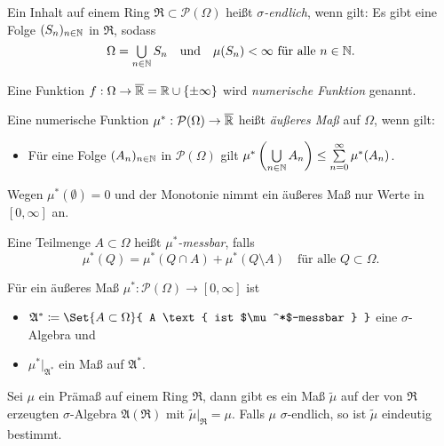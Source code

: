 \documentclass{cheat-sheet}
\newcommand{\PS}{\mathcal{P}} %
\newcommand{\PSO}{\PS(\Omega)} %
\newcommand{\Alg}{\mathfrak{A}} %
\newcommand{\Ring}{\mathfrak{R}} %
\theoremstyle{definition}
\begin{document}
\begin{defn}
  Ein Inhalt auf einem Ring $\Ring \subset \PSO$ heißt \emph{$\sigma$-endlich}, wenn gilt: Es gibt eine Folge $(S_n)_{n \in \mathbb{N}}$ in $\Ring$, sodass
  \[
      \Omega = \bigcup_{n \in \N} S_n
      \quad \text{und} \quad
      \mu(S_n) < \infty \text{ für alle } n \in \N.
  \]
\end{defn}

\begin{defn}
  Eine Funktion $f : \Omega \to \overline{\mathbb{R}} = \mathbb{R} \cup \{ \pm \infty \}$ wird \emph{numerische Funktion} genannt.
\end{defn}

\begin{defn}
  Eine numerische Funktion $\mu^* : \PSO \to \overline{\R}$ heißt \emph{äußeres Maß} auf $\Omega$, wenn gilt:
  \begin{itemize}
    \item Für eine Folge $(A_n)_{n \in \mathbb{N}}$ in $\mathcal{P}(\Omega)$ gilt $\mu^*\left(\bigcup_{n \in \N} A_n \right) \leq \sum_{n = 0}^\infty \mu^*(A_n)$. %
  \end{itemize}
\end{defn}

\begin{bem}
  Wegen $\mu^*(\emptyset) = 0$ und der Monotonie nimmt ein äußeres Maß nur Werte in $[0, \infty]$ an.
\end{bem}

\begin{defn}
  Eine Teilmenge $A \subset \Omega$ heißt \emph{$\mu^*$-messbar}, falls
  \[ \mu^*(Q) = \mu^*(Q \cap A) + \mu^*(Q \setminus A) \quad \text{für alle } Q \subset \Omega. \]
\end{defn}

\begin{satz}[Carathéodory]
  Für ein äußeres Maß $\mu^* : \PSO \to [0, \infty]$ ist
  \begin{itemize}
    \item $\Alg^* \coloneqq \Set{ A \subset \Omega }{ A \text{ ist $\mu^*$-messbar } }$ eine $\sigma$-Algebra und
    \item $\mu^*|_{\Alg^*}$ ein Maß auf $\Alg^*$.
  \end{itemize}
\end{satz}

\begin{satz}
  Sei $\mu$ ein Prämaß auf einem Ring $\Ring$, dann gibt es ein Maß $\tilde{\mu}$ auf der von $\Ring$ erzeugten $\sigma$-Algebra $\Alg(\Ring)$ mit $\tilde{\mu}|_\Ring = \mu$. Falls $\mu$ $\sigma$-endlich, so ist $\tilde{\mu}$ eindeutig bestimmt.
\end{satz}
\end{document}

